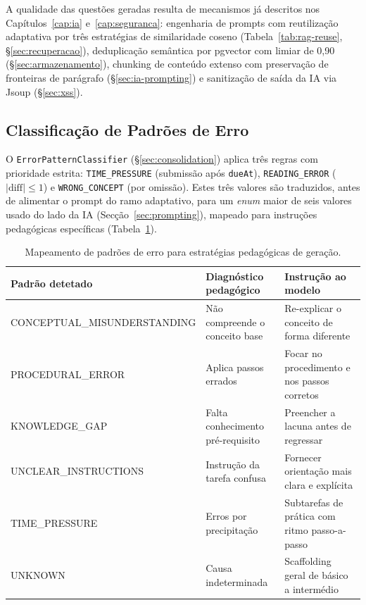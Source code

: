 A qualidade das questões geradas resulta de mecanismos já descritos nos Capítulos~\ref{cap:ia} e~\ref{cap:seguranca}: engenharia de prompts com reutilização adaptativa por três estratégias de similaridade coseno (Tabela~\ref{tab:rag-reuse}, §\ref{sec:recuperacao}), deduplicação semântica por pgvector com limiar de 0,90 (§\ref{sec:armazenamento}), chunking de conteúdo extenso com preservação de fronteiras de parágrafo (§\ref{sec:ia-prompting}) e sanitização de saída da IA via Jsoup (§\ref{sec:xss}).

\subsection{Classificação de Padrões de Erro} \label{sec:error-pattern-results}

O \texttt{ErrorPatternClassifier} (§\ref{sec:consolidation}) aplica três regras com prioridade estrita: \texttt{TIME\_PRESSURE} (submissão após \texttt{dueAt}), \texttt{READING\_ERROR} ($|\text{diff}| \leq 1$) e \texttt{WRONG\_CONCEPT} (por omissão). Estes três valores são traduzidos, antes de alimentar o prompt do ramo adaptativo, para um \textit{enum} maior de seis valores usado do lado da IA (Secção~\ref{sec:prompting}), mapeado para instruções pedagógicas específicas (Tabela~\ref{tab:error-pattern-pedagogico}).

\begin{table}[htb]
\centering
\caption{Mapeamento de padrões de erro para estratégias pedagógicas de geração.}
\label{tab:error-pattern-pedagogico}
\begin{tabular}{@{}lll@{}}
\toprule
\textbf{Padrão detetado} & \textbf{Diagnóstico pedagógico} & \textbf{Instrução ao modelo} \\
\midrule
CONCEPTUAL\_MISUNDERSTANDING & Não compreende o conceito base        & Re-explicar o conceito de forma diferente \\
PROCEDURAL\_ERROR            & Aplica passos errados                 & Focar no procedimento e nos passos corretos \\
KNOWLEDGE\_GAP               & Falta conhecimento pré-requisito      & Preencher a lacuna antes de regressar \\
UNCLEAR\_INSTRUCTIONS        & Instrução da tarefa confusa           & Fornecer orientação mais clara e explícita \\
TIME\_PRESSURE               & Erros por precipitação                & Subtarefas de prática com ritmo passo-a-passo \\
UNKNOWN                      & Causa indeterminada                   & Scaffolding geral de básico a intermédio \\
\bottomrule
\end{tabular}
\end{table}

